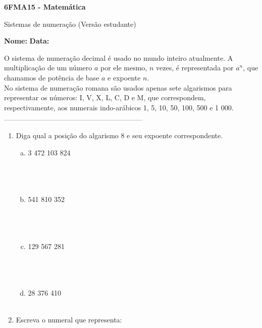 \documentclass[a4paper,14pt]{article}
\begin{document}
	
	\noindent\textbf{6FMA15 - Matemática} 
	
	\begin{center}Sistemas de numeração (Versão estudante)
	\end{center}
	
	\noindent\textbf{Nome:} \underline{\hspace{10cm}}
	\noindent\textbf{Data:} \underline{\hspace{4cm}}
	
	
	\begin{multicols}{2}
		\noindent O sistema de numeração decimal é usado no mundo inteiro atualmente. A multiplicação de um número $a$ por ele mesmo, $n$ vezes, é representada por $a^n$, que chamamos de potência de base $a$ e expoente $n$. \\
		No sistema de numeração romana são usados apenas sete algarismos para representar os números: I, V, X, L, C, D e M, que correspondem, respectivamente, aos numerais indo-arábicos 1, 5, 10, 50, 100, 500 e 1 000. \\
		\noindent\textsubscript{-----------------------------------------------------------------------}
		\begin{enumerate} 
			\item Diga qual a posição do algarismo 8 e seu expoente correspondente.
			\begin{enumerate}[a)]
				\item 3 472 103 824 \\\\\\\\
				\item 541 810 352 \\\\\\\\
				\item 129 567 281 \\\\\\\\
				\item 28 376 410 \\\\
			\end{enumerate}
			\item Escreva o numeral que representa:

\end{enumerate}
\end{multicols}
\end{document}
